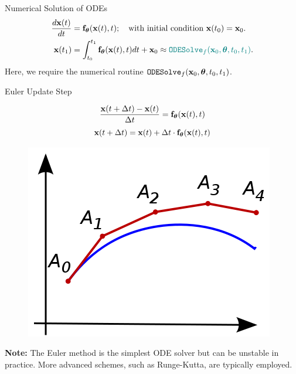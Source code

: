 \documentclass{beamer}
\begin{document}
\begin{frame}{Numerical Solution of ODEs}
	\vspace{-0.5cm}
	\begin{align*}
		\frac{d \mathbf{x}(t)}{dt} &= \mathbf{f}_{\boldsymbol{\theta}}(\mathbf{x}(t), t); \quad \text{with initial condition }\mathbf{x}(t_0) = \mathbf{x}_0. \\
		\mathbf{x}(t_1) &= \int^{t_1}_{t_0} \mathbf{f}_{\boldsymbol{\theta}}(\mathbf{x}(t), t) d t  + \mathbf{x}_0 \approx {\color{teal}\texttt{ODESolve}_f(\mathbf{x}_0, \boldsymbol{\theta}, t_0, t_1)}.
	\end{align*}
	Here, we require the numerical routine $\texttt{ODESolve}_f(\mathbf{x}_0, \boldsymbol{\theta}, t_0, t_1)$.
	\begin{block}{Euler Update Step}
		\begin{minipage}[t]{0.6\columnwidth}
			\vspace{-0.5cm}
			\[
	  			\frac{\mathbf{x}(t + \Delta t) - \mathbf{x}(t)}{\Delta t} = \mathbf{f}_{\boldsymbol{\theta}}(\mathbf{x}(t), t)
			\]
			\[
	  			\mathbf{x}(t + \Delta t) = \mathbf{x}(t) + \Delta t \cdot \mathbf{f}_{\boldsymbol{\theta}}(\mathbf{x}(t), t)
			\]
		\end{minipage}%
		\begin{minipage}[t]{0.4\columnwidth}
			\vspace{-0.3cm}
			\begin{figure}
				\centering
				\includegraphics[width=0.7\linewidth]{figs/euler}
			\end{figure}
		\end{minipage}
	\end{block}
	\textbf{Note:} The Euler method is the simplest ODE solver but can be unstable in practice. More advanced schemes, such as Runge-Kutta, are typically employed.
\end{frame}
\end{document}
